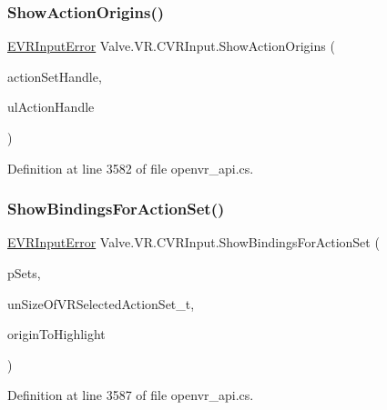 \mbox{\label{class_valve_1_1_v_r_1_1_c_v_r_input_a9e307e6a2f80eb19e9de3dcf676bb1ef}} 
\subsubsection{\texorpdfstring{ShowActionOrigins()}{ShowActionOrigins()}}
{\footnotesize\ttfamily \mbox{\hyperlink{namespace_valve_1_1_v_r_a592d7f4189b8346d6c96dbdbaa35bc1b}{E\+V\+R\+Input\+Error}} Valve.\+V\+R.\+C\+V\+R\+Input.\+Show\+Action\+Origins (\begin{DoxyParamCaption}\item[{ulong}]{action\+Set\+Handle,  }\item[{ulong}]{ul\+Action\+Handle }\end{DoxyParamCaption})}



Definition at line 3582 of file openvr\+\_\+api.\+cs.

\mbox{\label{class_valve_1_1_v_r_1_1_c_v_r_input_a3d925c06fcc1c105789a39a8079fe687}} 
\subsubsection{\texorpdfstring{ShowBindingsForActionSet()}{ShowBindingsForActionSet()}}
{\footnotesize\ttfamily \mbox{\hyperlink{namespace_valve_1_1_v_r_a592d7f4189b8346d6c96dbdbaa35bc1b}{E\+V\+R\+Input\+Error}} Valve.\+V\+R.\+C\+V\+R\+Input.\+Show\+Bindings\+For\+Action\+Set (\begin{DoxyParamCaption}\item[{\mbox{\hyperlink{struct_valve_1_1_v_r_1_1_v_r_active_action_set__t}{V\+R\+Active\+Action\+Set\+\_\+t}} \mbox{[}$\,$\mbox{]}}]{p\+Sets,  }\item[{uint}]{un\+Size\+Of\+V\+R\+Selected\+Action\+Set\+\_\+t,  }\item[{ulong}]{origin\+To\+Highlight }\end{DoxyParamCaption})}



Definition at line 3587 of file openvr\+\_\+api.\+cs.

